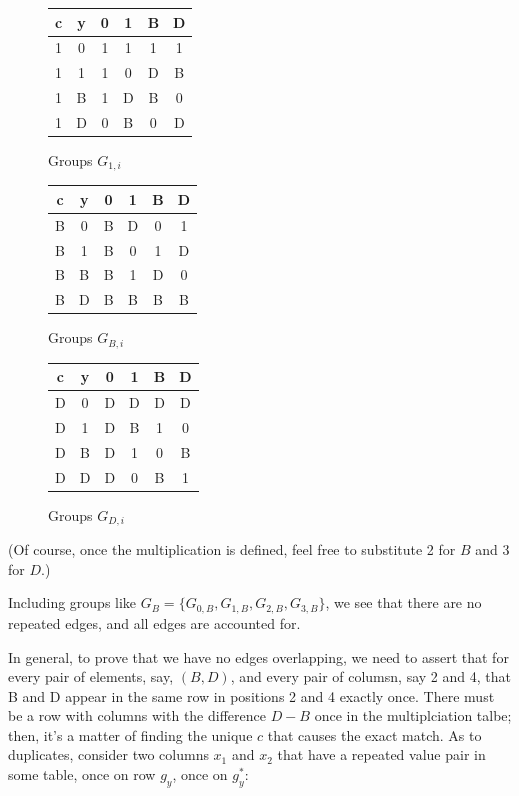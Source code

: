 \documentclass[11pt, oneside]{article} 	%
\begin{document}
\begin{figure}[!htb]
\centering

 \begin{tabular}{c c | c c c c}
   c & y & 0 & 1 & B & D \\
\hline
   1 & 0 & 1 & 1 & 1 & 1 \\
   1 & 1 & 1 & 0 & D & B \\
   1 & B & 1 & D & B & 0 \\
   1 & D & 0 & B & 0 & D \\
   \end{tabular}
\caption{Groups $G_{1,i}$}
\label{fig:gf4-1}
\end{figure}

\begin{figure}[!htb]
\centering
 \begin{tabular}{c c | c c c c}
   c & y & 0 & 1 & B & D \\
\hline
   B & 0 & B & D & 0 & 1 \\
   B & 1 & B & 0 & 1 & D \\
   B & B & B & 1 & D & 0 \\
   B & D & B & B & B & B \\
   \end{tabular}
\caption{Groups $G_{B,i}$}
\label{fig:gf4-B}
\end{figure}

\begin{figure}[!htb]
\centering
 \begin{tabular}{c c | c c c c}
   c & y & 0 & 1 & B & D \\
\hline
   D & 0 & D & D & D & D \\
   D & 1 & D & B & 1 & 0 \\
   D & B & D & 1 & 0 & B \\
   D & D & D & 0 & B & 1 \\
   \end{tabular}
\caption{Groups $G_{D,i}$}
\label{fig:gf4-D}
\end{figure}

(Of course, once the multiplication is defined, feel free to substitute 2 for $B$ and 3 for $D$.)


Including groups like $G_B = \{G_{0,B}, G_{1,B}, G_{2,B}, G_{3,B}\}$, we see that there are no repeated edges, and all edges are accounted for. 



In general, to prove that we have no edges overlapping, we need to assert that for every pair of elements, say, $(B, D)$, and every pair of columsn, say 2 and 4, that B and D appear in the same row in positions 2 and 4 exactly once. There must be a row with columns with the difference $D-B$ once in the multiplciation talbe; then, it's a matter of finding the unique $c$ that causes the exact match. As to duplicates, consider two columns $x_1$ and $x_2$ that have a repeated value pair in some table, once on row $g_y$, once on $g_y^*$:
\end{document}
